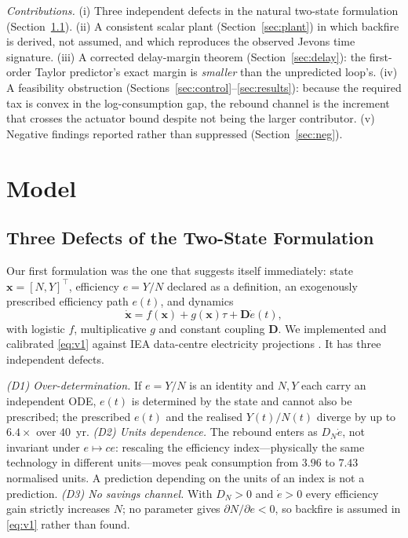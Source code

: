 \documentclass[conference,letterpaper,10pt]{IEEEtran}
\theoremstyle{plain}
\theoremstyle{remark}
\newcommand{\edot}{\dot{e}}
\begin{document}
\emph{Contributions.} (i) Three independent defects in the natural
two-state formulation (Section~\ref{sec:defects}). (ii) A consistent
scalar plant (Section~\ref{sec:plant}) in which backfire is derived,
not assumed, and which reproduces the observed Jevons time signature.
(iii) A corrected delay-margin theorem (Section~\ref{sec:delay}): the
first-order Taylor predictor's exact margin is \emph{smaller} than the
unpredicted loop's. (iv) A feasibility obstruction
(Sections~\ref{sec:control}--\ref{sec:results}): because the required
tax is convex in the log-consumption gap, the rebound channel is the
increment that crosses the actuator bound despite not being the larger
contributor. (v) Negative findings reported rather than suppressed
(Section~\ref{sec:neg}).

\section{Model}

\subsection{Three Defects of the Two-State Formulation}
\label{sec:defects}
Our first formulation was the one that suggests itself immediately: state
$\bm{x}=[N,Y]^{\!\top}$, efficiency $e=Y/N$ declared as a definition,
an exogenously prescribed efficiency path $e(t)$, and dynamics
\begin{equation}
\label{eq:v1}
    \dot{\bm{x}} = f(\bm{x}) + g(\bm{x})\tau + \bm{D}\edot(t),
\end{equation}
with logistic $f$, multiplicative $g$ and constant coupling $\bm{D}$.
We implemented and calibrated \eqref{eq:v1} against IEA data-centre
electricity projections \cite{iea2024}. It has three independent
defects.

\emph{(D1) Over-determination.} If $e=Y/N$ is an identity and $N,Y$
each carry an independent ODE, $e(t)$ is determined by the state and
cannot also be prescribed; the prescribed $e(t)$ and the realised
$Y(t)/N(t)$ diverge by up to $6.4\times$ over $40$~yr.
\emph{(D2) Units dependence.} The rebound enters as $D_N\edot$, not
invariant under $e\mapsto ce$: rescaling the efficiency
index---physically the same technology in different units---moves peak
consumption from $3.96$ to $7.43$ normalised units. A prediction
depending on the units of an index is not a prediction.
\emph{(D3) No savings channel.} With $D_N>0$ and $\edot>0$ every
efficiency gain strictly increases $N$; no parameter gives
$\partial N/\partial e<0$, so backfire is assumed in \eqref{eq:v1}
rather than found.
\end{document}
